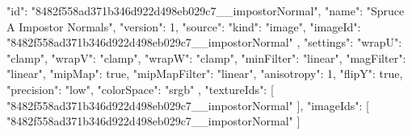 {
  "id": "8482f558ad371b346d922d498eb029c7__impostorNormal",
  "name": "Spruce A Impostor Normals",
  "version": 1,
  "source": {
    "kind": "image",
    "imageId": "8482f558ad371b346d922d498eb029c7__impostorNormal"
  },
  "settings": {
    "wrapU": "clamp",
    "wrapV": "clamp",
    "wrapW": "clamp",
    "minFilter": "linear",
    "magFilter": "linear",
    "mipMap": true,
    "mipMapFilter": "linear",
    "anisotropy": 1,
    "flipY": true,
    "precision": "low",
    "colorSpace": "srgb"
  },
  "textureIds": [
    "8482f558ad371b346d922d498eb029c7__impostorNormal"
  ],
  "imageIds": [
    "8482f558ad371b346d922d498eb029c7__impostorNormal"
  ]
}
